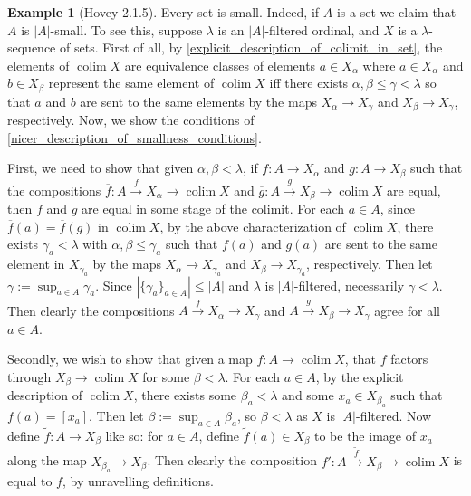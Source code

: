 \documentclass{amsart}
\newcommand{\ol}{\overline}
\theoremstyle{plain}
\theoremstyle{definition}
\newtheorem{example}[theorem]{Example}
\newcommand{\wt}{\widetilde}
\newcommand{\0}{\mathbf{0}}
\renewcommand{\ol}{\overline}
\renewcommand{\(}{\left(}
\renewcommand{\)}{\right)}
\DeclareMathOperator*{\colim}{colim}
\begin{document}
\begin{example}[Hovey 2.1.5]\label{2.1.5}
  Every set is small. Indeed, if $A$ is a set we claim that $A$ is $|A|$-small. To see this, suppose $\lambda$ is an $|A|$-filtered ordinal, and $X$ is a $\lambda$-sequence of sets. First of all, by \autoref{explicit_description_of_colimit_in_set}, the elements of $\colim X$ are equivalence classes of elements $a\in X_\alpha$ where $a\in X_\alpha$ and $b\in X_\beta$ represent the same element of $\colim X$ iff there exists $\alpha,\beta\leq\gamma<\lambda$ so that $a$ and $b$ are sent to the same elements by the maps $X_\alpha\to X_\gamma$ and $X_\beta\to X_\gamma$, respectively. Now, we show the conditions of \autoref{nicer_description_of_smallness_conditions}.
  
  First, we need to show that given $\alpha,\beta<\lambda$, if $f:A\to X_\alpha$ and $g:A\to X_{\beta}$ such that the compositions $\ol f:A\xrightarrow{f}X_\alpha\to \colim X$ and $\ol g:A\xrightarrow{g}X_{\beta}\to \colim X$ are equal, then $f$ and $g$ are equal in some stage of the colimit. For each $a\in A$, since $\ol f(a)=\ol f(g)$ in $\colim X$, by the above characterization of $\colim X$, there exists $\gamma_a<\lambda$ with $\alpha,\beta\leq\gamma_a$ such that $f(a)$ and $g(a)$ are sent to the same element in $X_{\gamma_a}$ by the maps $X_\alpha\to X_{\gamma_a}$ and $X_\beta\to X_{\gamma_a}$, respectively. Then let $\gamma:=\sup_{a\in A}\gamma_a$. Since $\left|\{\gamma_a\}_{a\in A}\right|\leq|A|$ and $\lambda$ is $|A|$-filtered, necessarily $\gamma<\lambda$. Then clearly the compositions $A\xrightarrow{f}X_\alpha\to X_\gamma$ and $A\xrightarrow{g}X_\beta\to X_\gamma$ agree for all $a\in A$.

  Secondly, we wish to show that given a map $f:A\to\colim X$, that $f$ factors through $X_\beta\to \colim X$ for some $\beta<\lambda$. For each $a\in A$, by the explicit description of $\colim X$, there exists some $\beta_a<\lambda$ and some $x_a\in X_{\beta_a}$ such that $f(a)=[x_a]$. Then let $\beta:=\sup_{a\in A}\beta_a$, so $\beta<\lambda$ as $X$ is $|A|$-filtered. Now define $\wt f:A\to X_\beta$ like so: for $a\in A$, define $\wt f(a)\in X_\beta$ to be the image of $x_a$ along the map $X_{\beta_a}\to X_\beta$. Then clearly the composition $f':A\xrightarrow{\wt f}X_\beta\to\colim X$ is equal to $f$, by unravelling definitions.
\end{example}
\end{document}
